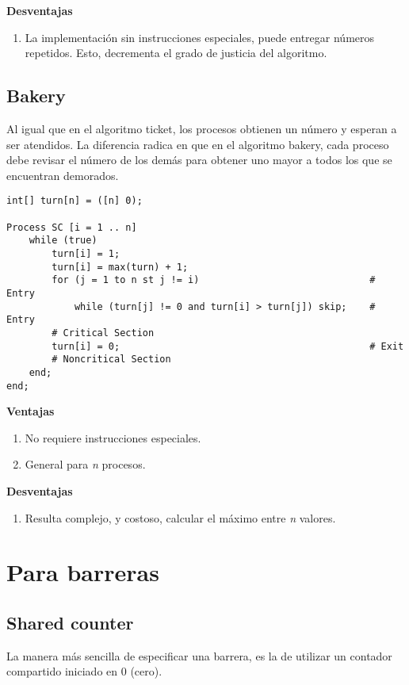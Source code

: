 \documentclass[a4paper, 10pt, margin=0in]{report}
\begin{document}
\textbf{Desventajas}
\begin{enumerate}
    \item La implementación sin instrucciones especiales, puede entregar números repetidos. Esto, decrementa el grado de justicia del algoritmo.
\end{enumerate}


\subsection{Bakery}

Al igual que en el algoritmo ticket, los procesos obtienen un número y esperan a ser atendidos. La diferencia radica en que en el algoritmo bakery, cada proceso debe revisar el número de los demás para obtener uno mayor a todos los que se encuentran demorados.

\begin{lstlisting}
int[] turn[n] = ([n] 0);

Process SC [i = 1 .. n]
    while (true)
        turn[i] = 1; 
        turn[i] = max(turn) + 1;
        for (j = 1 to n st j != i)                              # Entry
            while (turn[j] != 0 and turn[i] > turn[j]) skip;    # Entry
        # Critical Section
        turn[i] = 0;                                            # Exit
        # Noncritical Section
    end;
end;
\end{lstlisting}

\textbf{Ventajas}
\begin{enumerate}
    \item No requiere instrucciones especiales.
    \item General para \emph{n} procesos.
\end{enumerate}

\textbf{Desventajas}
\begin{enumerate}
    \item Resulta complejo, y costoso, calcular el máximo entre \emph{n} valores.
\end{enumerate}


\section{Para barreras}

\subsection{Shared counter}

La manera más sencilla de especificar una barrera, es la de utilizar un contador compartido iniciado en 0 (cero). 
\end{document}
